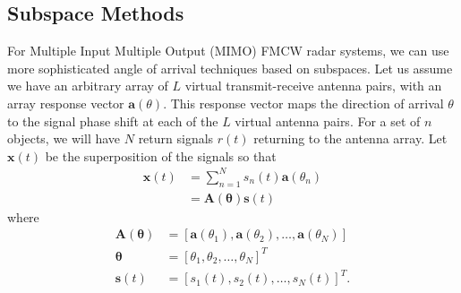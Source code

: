 \subsection{Subspace Methods}
For Multiple Input Multiple Output (MIMO) FMCW radar systems, we can use more
sophisticated angle of arrival techniques based on subspaces. Let
us assume we have an arbitrary array of $L$ virtual transmit-receive antenna pairs, with an
array response vector $\bm{a}(\theta)$. This response vector maps the direction
of arrival $\theta$ to the signal phase shift at each of the $L$ virtual antenna
pairs. For a set of $n$ objects, we will have $N$ return signals $r(t)$
returning to the antenna array. Let $\bm{x}(t)$ be the superposition of the
signals so that \cite{bresler2017hilbert}
\begin{align}
	\bm{x}(t) &= \sum_{n=1}^N s_n(t) \bm{a}(\theta_n)\\
	&= \bm{A}(\bm{\theta})\bm{s}(t)
\end{align}
where
\begin{align}
	\bm{A}(\bm{\theta}) &= [\bm{a}(\theta_1), \bm{a}(\theta_2), \dots, \bm{a}(\theta_N)]\\
	\bm{\theta} &= [\theta_1, \theta_2, \dots, \theta_N]^T\\
	\bm{s}(t) &= [s_1(t), s_2(t), \dots, s_N(t)]^T.
\end{align}


